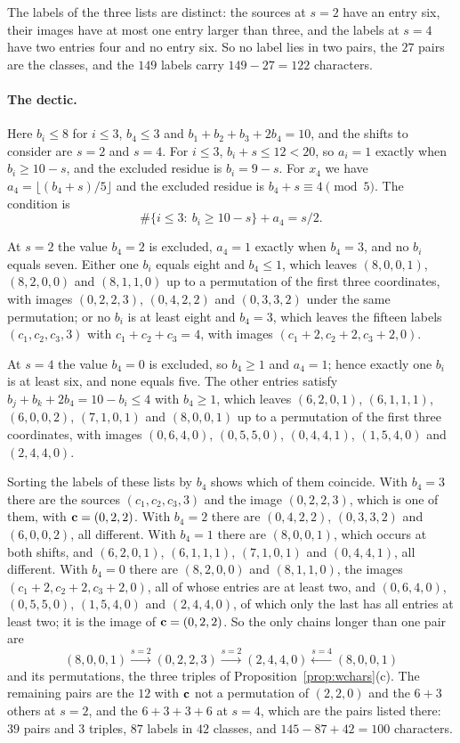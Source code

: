 The labels of the three lists are distinct: the sources at $s=2$ have an
entry six, their images have at most one entry larger than three, and the
labels at $s=4$ have two entries four and no entry six. So no label lies in
two pairs, the $27$ pairs are the classes, and the $149$ labels carry
$149-27=122$ characters.

\paragraph*{The dectic.}
Here $b_i\le8$ for $i\le3$, $b_4\le3$ and $b_1+b_2+b_3+2b_4=10$, and the
shifts to consider are $s=2$ and $s=4$. For $i\le3$, $b_i+s\le12<20$, so
$a_i=1$ exactly when $b_i\ge10-s$, and the excluded residue is
$b_i=9-s$. For $x_4$ we have $a_4=\lfloor(b_4+s)/5\rfloor$ and the excluded
residue is $b_4+s\equiv4\pmod5$. The condition is
\[
\#\{i\le3:\ b_i\ge10-s\}+a_4=s/2 .
\]

At $s=2$ the value $b_4=2$ is excluded, $a_4=1$ exactly when $b_4=3$, and
no $b_i$ equals seven. Either one $b_i$ equals eight and $b_4\le1$, which
leaves $(8,0,0,1)$, $(8,2,0,0)$ and $(8,1,1,0)$ up to a permutation of the
first three coordinates, with images $(0,2,2,3)$, $(0,4,2,2)$ and
$(0,3,3,2)$ under the same permutation; or no $b_i$ is at least eight and
$b_4=3$, which leaves the fifteen labels $(c_1,c_2,c_3,3)$ with
$c_1+c_2+c_3=4$, with images $(c_1+2,c_2+2,c_3+2,0)$.

At $s=4$ the value $b_4=0$ is excluded, so $b_4\ge1$ and $a_4=1$; hence
exactly one $b_i$ is at least six, and none equals five. The other entries
satisfy $b_j+b_k+2b_4=10-b_i\le4$ with $b_4\ge1$, which leaves
$(6,2,0,1)$, $(6,1,1,1)$, $(6,0,0,2)$, $(7,1,0,1)$ and $(8,0,0,1)$ up to
a permutation of the first three coordinates, with images $(0,6,4,0)$,
$(0,5,5,0)$, $(0,4,4,1)$, $(1,5,4,0)$ and $(2,4,4,0)$.

Sorting the labels of these lists by $b_4$ shows which of them coincide.
With $b_4=3$ there are the sources $(c_1,c_2,c_3,3)$ and the image
$(0,2,2,3)$, which is one of them, with $\mathbf{c}=(0,2,2)$. With $b_4=2$ there
are $(0,4,2,2)$, $(0,3,3,2)$ and $(6,0,0,2)$, all different. With $b_4=1$
there are $(8,0,0,1)$, which occurs at both shifts, and $(6,2,0,1)$,
$(6,1,1,1)$, $(7,1,0,1)$ and $(0,4,4,1)$, all different. With $b_4=0$ there
are $(8,2,0,0)$ and $(8,1,1,0)$, the images $(c_1+2,c_2+2,c_3+2,0)$, all of
whose entries are at least two, and $(0,6,4,0)$, $(0,5,5,0)$, $(1,5,4,0)$
and $(2,4,4,0)$, of which only the last has all entries at least two; it is
the image of $\mathbf{c}=(0,2,2)$. So the only chains longer than one pair are
\[
(8,0,0,1)\xrightarrow{s=2}(0,2,2,3)\xrightarrow{s=2}
(2,4,4,0)\xleftarrow{s=4}(8,0,0,1)
\]
and its permutations, the three triples of Proposition~\ref{prop:wchars}(c).
The remaining pairs are the $12$ with $\mathbf{c}$ not a permutation of $(2,2,0)$
and the $6+3$ others at $s=2$, and the $6+3+3+6$ at $s=4$, which are the
pairs listed there: $39$ pairs and $3$ triples, $87$ labels in $42$ classes,
and $145-87+42=100$ characters.

